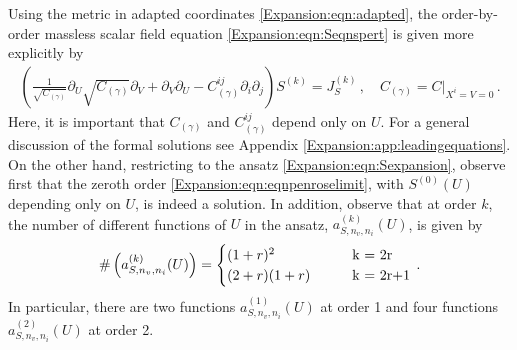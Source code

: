 Using the metric in adapted coordinates \eqref{Expansion:eqn:adapted}, the order-by-order massless scalar field equation \eqref{Expansion:eqn:Seqnspert} is given more explicitly by 
\begin{equation}\label{Expansion:eqn:Seqnspertexpl}
\begin{aligned}
\left( \frac{1}{\sqrt{C_{(\gamma)}}}\partial_U \sqrt{C_{(\gamma)}} \partial_V + \partial_V\partial_U  - C_{(\gamma)}^{ij}  \partial_i  \partial_j \right)S^{(k)} = J_S^{(k)} \, , \quad C_{(\gamma)} = C|_{X^i=V=0} \, .
\end{aligned}
\end{equation}
Here, it is important that $C_{(\gamma)}$ and $C_{(\gamma)}^{ij}$ depend only on $U$. For a general discussion of the formal solutions see Appendix \ref{Expansion:app:leadingequations}. On the other hand, restricting to the ansatz \eqref{Expansion:eqn:Sexpansion}, observe first that the zeroth order \eqref{Expansion:eqn:eqnpenroselimit}, with $S^{(0)}(U)$ depending only on $U$, is indeed a solution. In addition, observe that at order $k$, the number of different functions of $U$ in the ansatz, $a^{(k)}_{S,n_v, n_i}(U)$, is given by
\begin{equation}
\#\left(a^{(k)}_{S,n_v, n_i}(U)\right) =\begin{cases}
(1+r)^2  \quad \quad  & $k = 2r$ \\
(2+r)(1+r)  \quad \quad  & $k = 2r+1$ \\
\end{cases}  \, .
\end{equation} 
In particular, there are two functions $a^{(1)}_{S,n_v, n_i}(U)$ at order 1 and  four functions $a^{(2)}_{S,n_v, n_i}(U)$ at order 2.

